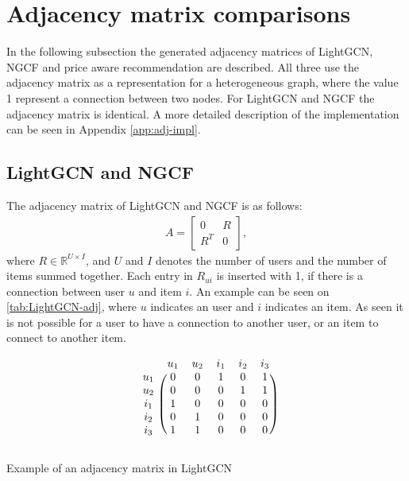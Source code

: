 \section{Adjacency matrix comparisons}
In the following subsection the generated adjacency matrices of LightGCN, NGCF and price aware recommendation are described.
All three use the adjacency matrix as a representation for a heterogeneous graph, where the value 1 represent a connection between two nodes.
For LightGCN and NGCF the adjacency matrix is identical.
A more detailed description of the implementation can be seen in Appendix \ref{app:adj-impl}.

\subsection{LightGCN and NGCF}
The adjacency matrix of LightGCN and NGCF is as follows:
\begin{gather}
    A =
    \begin{bmatrix}
        0   & R \\
        R^T & 0
    \end{bmatrix},
\end{gather}
where $R \in \mathbb{R}^{U \times I}$, and $U$ and $I$ denotes the number of users and the number of items summed together.
Each entry in $R_{ui}$ is inserted with 1, if there is a connection between user $u$ and item $i$.
An example can be seen on \autoref{tab:LightGCN-adj}, where $u$ indicates an user and $i$ indicates an item.
As seen it is not possible for a user to have a connection to another user, or an item to connect to another item.
\begin{table}

    \[
        \begin{blockarray}{cccccc}
            & u_1 & u_2 & i_1 & i_2 & i_3 \\
            \begin{block}{c(ccccc)}
                u_1 & 0 & 0 & 1 & 0 & 1   \\
                u_2 & 0 & 0 & 0 & 1 & 1   \\
                i_1 & 1 & 0 & 0 & 0 & 0   \\
                i_2 & 0 & 1 & 0 & 0 & 0   \\
                i_3 & 1 & 1 & 0 & 0 & 0   \\
            \end{block}
        \end{blockarray}
    \]
    \caption{Example of an adjacency matrix in LightGCN}
    \label{tab:LightGCN-adj}
\end{table}

